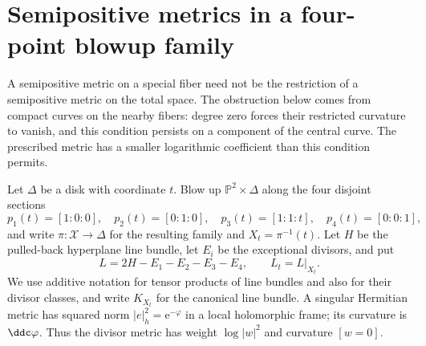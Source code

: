 \section{Semipositive metrics in a four-point blowup family}
\label{sec:four-point-metric-nonextension}

A semipositive metric on a special fiber need not be the restriction of a semipositive metric on the total space. The obstruction below comes from compact curves on the nearby fibers: degree zero forces their restricted curvature to vanish, and this condition persists on a component of the central curve. The prescribed metric has a smaller logarithmic coefficient than this condition permits.

Let $\Delta$ be a disk with coordinate $t$. Blow up $\mathbb P^2\times\Delta$ along the four disjoint sections
\[
 p_1(t)=[1:0:0],\quad p_2(t)=[0:1:0],\quad
 p_3(t)=[1:1:t],\quad p_4(t)=[0:0:1],
\]
and write $\pi:\mathcal X\to\Delta$ for the resulting family and $X_t=\pi^{-1}(t)$. Let $H$ be the pulled-back hyperplane line bundle, let $E_i$ be the exceptional divisors, and put
\[
 L=2H-E_1-E_2-E_3-E_4,\qquad L_t=L|_{X_t}.
\]
We use additive notation for tensor products of line bundles and also for their divisor classes, and write $K_{X_t}$ for the canonical line bundle. A singular Hermitian metric has squared norm $|e|_h^2=\mathrm{e}^{-\varphi}$ in a local holomorphic frame; its curvature is $\ddc\varphi$. Thus the divisor metric has weight $\log|w|^2$ and curvature $[w=0]$.

